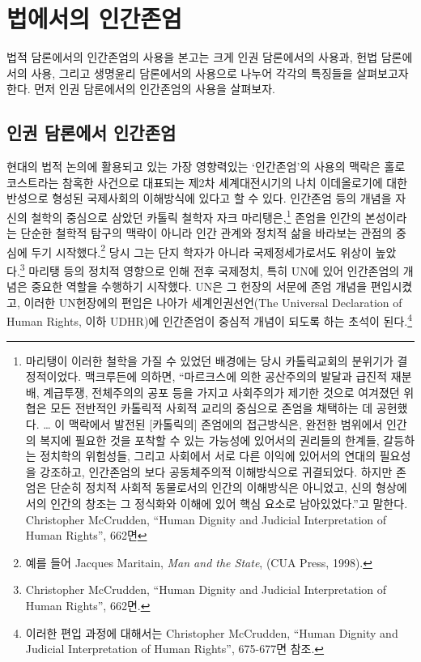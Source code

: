 \section{법에서의 인간존엄}

법적 담론에서의 인간존엄의 사용을 본고는 크게 인권 담론에서의 사용과, 헌법 담론에서의 사용, 그리고 생명윤리 담론에서의 사용으로 나누어 각각의 특징들을 살펴보고자 한다. 먼저 인권 담론에서의 인간존엄의 사용을 살펴보자.

\subsection{인권 담론에서 인간존엄}

현대의 법적 논의에 활용되고 있는 가장 영향력있는 `인간존엄'의 사용의 맥락은 홀로코스트라는 참혹한 사건으로 대표되는 제2차 세계대전시기의 나치 이데올로기에 대한 반성으로 형성된 국제사회의 이해방식에 있다고 할 수 있다. 인간존엄 등의 개념을 자신의 철학의 중심으로 삼았던 카톨릭 철학자 자크 마리탱은,\footnote{마리탱이 이러한 철학을 가질 수 있었던 배경에는 당시 카톨릭교회의 분위기가 결정적이었다. 맥크루든에 의하면, ``마르크스에 의한 공산주의의 발달과 급진적 재분배, 계급투쟁, 전체주의의 공포 등을 가지고 사회주의가 제기한 것으로 여겨졌던 위협은 모든 전반적인 카톨릭적 사회적 교리의 중심으로 존엄을 채택하는 데 공헌했다. \ldots{} 이 맥락에서 발전된 {[}카톨릭의{]} 존엄에의 접근방식은, 완전한 범위에서 인간의 복지에 필요한 것을 포착할 수 있는 가능성에 있어서의 권리들의 한계들, 갈등하는 정치학의 위험성들, 그리고 사회에서 서로 다른 이익에 있어서의 연대의 필요성을 강조하고, 인간존엄의 보다 공동체주의적 이해방식으로 귀결되었다. 하지만 존엄은 단순히 정치적 사회적 동물로서의 인간의 이해방식은 아니었고, 신의 형상에서의 인간의 창조는 그 정식화와 이해에 있어 핵심 요소로 남아있었다.''고 말한다. Christopher McCrudden, ``Human Dignity and Judicial Interpretation of Human Rights'', 662면} 존엄을 인간의 본성이라는 단순한 철학적 탐구의 맥락이 아니라 인간 관계와 정치적 삶을 바라보는 관점의 중심에 두기 시작했다.\footnote{예를 들어 Jacques Maritain, \emph{Man and the State}, (CUA Press, 1998).} 당시 그는 단지 학자가 아니라 국제정세가로서도 위상이 높았다.\footnote{Christopher McCrudden, ``Human Dignity and Judicial Interpretation of Human Rights'', 662면.} 마리탱 등의 정치적 영향으로 인해 전후 국제정치, 특히 UN에 있어 인간존엄의 개념은 중요한 역할을 수행하기 시작했다. UN은 그 헌장의 서문에 존엄 개념을 편입시켰고, 이러한 UN헌장에의 편입은 나아가 세계인권선언(The Universal Declaration of Human Rights, 이하 UDHR)에 인간존엄이 중심적 개념이 되도록 하는 초석이 된다.\footnote{이러한 편입 과정에 대해서는 Christopher McCrudden, ``Human Dignity and Judicial Interpretation of Human Rights'', 675-677면 참조.}

